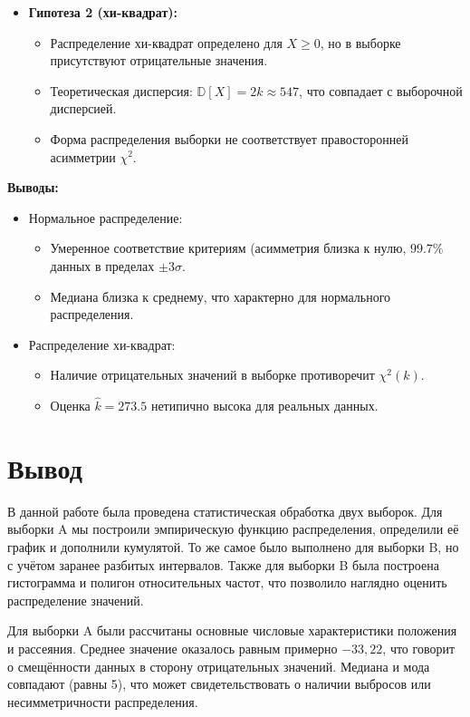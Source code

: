 \documentclass[12pt]{article}
\begin{document}
\begin{enumerate}
\begin{itemize}
        \item \textbf{Гипотеза 2 (хи-квадрат):}  
            \begin{itemize}  
                \item Распределение хи-квадрат определено для \( X \geq 0 \), но в выборке присутствуют отрицательные значения.  
                \item Теоретическая дисперсия: \( \mathbb{D}[X] = 2k \approx 547 \), что совпадает с выборочной дисперсией.  
                \item Форма распределения выборки не соответствует правосторонней асимметрии \( \chi^2 \).  
            \end{itemize}  
    \end{itemize}  
\textbf{Выводы:}
\begin{itemize}
\item Нормальное распределение:
\begin{itemize}
\item Умеренное соответствие критериям (асимметрия близка к нулю, $99.7\%$ данных в пределах $\pm 3\sigma$.
\item Медиана близка к среднему, что характерно для нормального распределения.
\end{itemize}
\item Распределение хи-квадрат:
\begin{itemize}
\item Наличие отрицательных значений в выборке противоречит $\chi^2(k)$.
\item Оценка $\hat{k} = 273.5$ нетипично высока для реальных данных.
\end{itemize}
\end{itemize}\end{enumerate}

\section*{Вывод}

В данной работе была проведена статистическая обработка двух выборок. Для выборки A мы построили эмпирическую функцию распределения, определили её график и дополнили кумулятой. То же самое было выполнено для выборки B, но с учётом заранее разбитых интервалов. Также для выборки B была построена гистограмма и полигон относительных частот, что позволило наглядно оценить распределение значений.

Для выборки A были рассчитаны основные числовые характеристики положения и рассеяния. Среднее значение оказалось равным примерно $-33{,}22$, что говорит о смещённости данных в сторону отрицательных значений. Медиана и мода совпадают (равны 5), что может свидетельствовать о наличии выбросов или несимметричности распределения.
\end{document}
